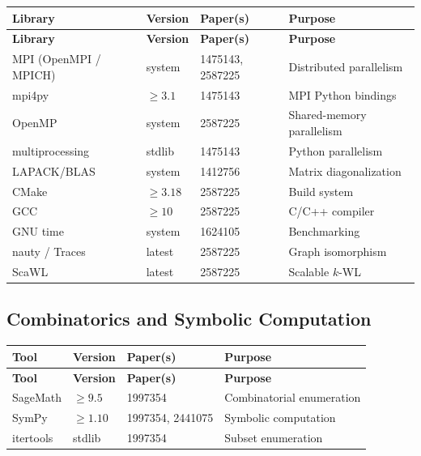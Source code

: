 \documentclass[11pt,a4paper]{article}
\begin{document}
\begin{longtable}{p{4cm} p{2cm} p{3cm} p{5cm}}
\toprule
\textbf{Library} & \textbf{Version} & \textbf{Paper(s)} & \textbf{Purpose} \\
\midrule
\endfirsthead
\toprule
\textbf{Library} & \textbf{Version} & \textbf{Paper(s)} & \textbf{Purpose} \\
\midrule
\endhead
MPI (OpenMPI / MPICH) & system & 1475143, 2587225 & Distributed parallelism \\
\midrule
mpi4py & $\geq 3.1$ & 1475143 & MPI Python bindings \\
\midrule
OpenMP & system & 2587225 & Shared-memory parallelism \\
\midrule
multiprocessing & stdlib & 1475143 & Python parallelism \\
\midrule
LAPACK/BLAS & system & 1412756 & Matrix diagonalization \\
\midrule
CMake & $\geq 3.18$ & 2587225 & Build system \\
\midrule
GCC & $\geq 10$ & 2587225 & C/C++ compiler \\
\midrule
GNU time & system & 1624105 & Benchmarking \\
\midrule
nauty / Traces & latest & 2587225 & Graph isomorphism \\
\midrule
ScaWL & latest & 2587225 & Scalable $k$-WL \\
\bottomrule
\end{longtable}


\subsection{Combinatorics and Symbolic Computation}

\begin{longtable}{p{3.5cm} p{2cm} p{3cm} p{5cm}}
\toprule
\textbf{Tool} & \textbf{Version} & \textbf{Paper(s)} & \textbf{Purpose} \\
\midrule
\endfirsthead
\toprule
\textbf{Tool} & \textbf{Version} & \textbf{Paper(s)} & \textbf{Purpose} \\
\midrule
\endhead
SageMath & $\geq 9.5$ & 1997354 & Combinatorial enumeration \\
\midrule
SymPy & $\geq 1.10$ & 1997354, 2441075 & Symbolic computation \\
\midrule
itertools & stdlib & 1997354 & Subset enumeration \\
\bottomrule
\end{longtable}
\end{document}
